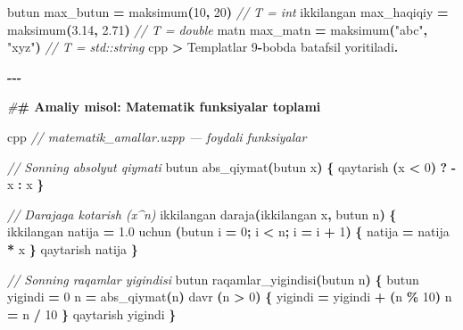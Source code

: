 \documentclass[a4paper,11pt,twoside,openright]{book}
\newenvironment{Shaded}{\begin{snugshade}}{\end{snugshade}}
\newcommand{\CommentTok}[1]{\textcolor[rgb]{0.56,0.35,0.01}{\textit{#1}}}
\newcommand{\DecValTok}[1]{\textcolor[rgb]{0.00,0.00,0.81}{#1}}
\newcommand{\ErrorTok}[1]{\textcolor[rgb]{0.64,0.00,0.00}{\textbf{#1}}}
\newcommand{\FloatTok}[1]{\textcolor[rgb]{0.00,0.00,0.81}{#1}}
\newcommand{\NormalTok}[1]{#1}
\newcommand{\OperatorTok}[1]{\textcolor[rgb]{0.81,0.36,0.00}{\textbf{#1}}}
\newcommand{\PreprocessorTok}[1]{\textcolor[rgb]{0.56,0.35,0.01}{\textit{#1}}}
\newcommand{\StringTok}[1]{\textcolor[rgb]{0.31,0.60,0.02}{#1}}
\begin{document}
\begin{Shaded}
\begin{Highlighting}[]
\NormalTok{butun max\_butun }\OperatorTok{=}\NormalTok{ maksimum}\OperatorTok{(}\DecValTok{10}\OperatorTok{,} \DecValTok{20}\OperatorTok{)}         \CommentTok{// T = int}
\NormalTok{ikkilangan max\_haqiqiy }\OperatorTok{=}\NormalTok{ maksimum}\OperatorTok{(}\FloatTok{3.14}\OperatorTok{,} \FloatTok{2.71}\OperatorTok{)}  \CommentTok{// T = double}
\NormalTok{matn max\_matn }\OperatorTok{=}\NormalTok{ maksimum}\OperatorTok{(}\StringTok{"abc"}\OperatorTok{,} \StringTok{"xyz"}\OperatorTok{)}     \CommentTok{// T = std::string}
\ErrorTok{\textasciigrave{}\textasciigrave{}\textasciigrave{}}\NormalTok{cpp}
\OperatorTok{\textgreater{}}\NormalTok{ Templatlar }\DecValTok{9}\OperatorTok{{-}}\NormalTok{bobda batafsil yoritiladi}\OperatorTok{.}

\OperatorTok{{-}{-}{-}}

\PreprocessorTok{\#}\ErrorTok{\# Amaliy misol: Matematik funksiyalar to\textquotesingle{}plami}

\ErrorTok{\textasciigrave{}\textasciigrave{}\textasciigrave{}}\NormalTok{cpp}
\CommentTok{// matematik\_amallar.uzpp — foydali funksiyalar}

\CommentTok{// Sonning absolyut qiymati}
\NormalTok{butun abs\_qiymat}\OperatorTok{(}\NormalTok{butun x}\OperatorTok{)} \OperatorTok{\{}
\NormalTok{    qaytarish }\OperatorTok{(}\NormalTok{x }\OperatorTok{\textless{}} \DecValTok{0}\OperatorTok{)} \OperatorTok{?} \OperatorTok{{-}}\NormalTok{x }\OperatorTok{:}\NormalTok{ x}
\OperatorTok{\}}

\CommentTok{// Darajaga ko\textquotesingle{}tarish (x\^{}n)}
\NormalTok{ikkilangan daraja}\OperatorTok{(}\NormalTok{ikkilangan x}\OperatorTok{,}\NormalTok{ butun n}\OperatorTok{)} \OperatorTok{\{}
\NormalTok{    ikkilangan natija }\OperatorTok{=} \FloatTok{1.0}
\NormalTok{    uchun }\OperatorTok{(}\NormalTok{butun i }\OperatorTok{=} \DecValTok{0}\OperatorTok{;}\NormalTok{ i }\OperatorTok{\textless{}}\NormalTok{ n}\OperatorTok{;}\NormalTok{ i }\OperatorTok{=}\NormalTok{ i }\OperatorTok{+} \DecValTok{1}\OperatorTok{)} \OperatorTok{\{}
\NormalTok{        natija }\OperatorTok{=}\NormalTok{ natija }\OperatorTok{*}\NormalTok{ x}
    \OperatorTok{\}}
\NormalTok{    qaytarish natija}
\OperatorTok{\}}

\CommentTok{// Sonning raqamlar yig\textquotesingle{}indisi}
\NormalTok{butun raqamlar\_yigindisi}\OperatorTok{(}\NormalTok{butun n}\OperatorTok{)} \OperatorTok{\{}
\NormalTok{    butun yigindi }\OperatorTok{=} \DecValTok{0}
\NormalTok{    n }\OperatorTok{=}\NormalTok{ abs\_qiymat}\OperatorTok{(}\NormalTok{n}\OperatorTok{)}
\NormalTok{    davr }\OperatorTok{(}\NormalTok{n }\OperatorTok{\textgreater{}} \DecValTok{0}\OperatorTok{)} \OperatorTok{\{}
\NormalTok{        yigindi }\OperatorTok{=}\NormalTok{ yigindi }\OperatorTok{+} \OperatorTok{(}\NormalTok{n }\OperatorTok{\%} \DecValTok{10}\OperatorTok{)}
\NormalTok{        n }\OperatorTok{=}\NormalTok{ n }\OperatorTok{/} \DecValTok{10}
    \OperatorTok{\}}
\NormalTok{    qaytarish yigindi}
\OperatorTok{\}}


\end{Highlighting}
\end{Shaded}
\end{document}
